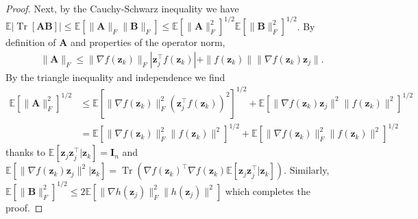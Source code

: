 \documentclass[11pt]{amsart}
\numberwithin{equation}{section}
\numberwithin{equation}{section}
\def\E{{\mathbb{E}}}
\DeclareMathOperator{\trace}{Tr}
\def\mathbold{\boldsymbol} %
\def\bA{\mathbold{A}}\def\calA{{\cal A}}\def\scrA{{\mathscr A}}\def\Ahat{\widehat{A}}\def\Atil{{\widetilde A}}
\def\bB{\mathbold{B}}\def\calB{{\cal B}}\def\scrB{{\mathscr B}}\def\Bhat{\widehat{B}}\def\Btil{{\widetilde B}}
\def\bI{\mathbold{I}}\def\hbI{{\widehat{\bI}}}\def\tbI{{\widetilde{\bI}}}
\def\bz{\mathbold{z}}\def\zhat{\widehat{z}}\def\ztil{\widetilde{z}}\def\zbar{{\overline z}}
\def\calB{{\mathscr B}}
\begin{document}
\begin{proof}
    Next, by the Cauchy-Schwarz inequality we have
    $\E|\trace[\bA\bB]|
    \le \E[\|\bA\|_F\|\bB\|_F]
    \le \E[\|\bA\|_F^2]^{1/2}
        \E[\|\bB\|_F^2]^{1/2}
    $.
    By definition of $\bA$ and properties
    of the operator norm,
    \begin{align*}
    &\|\bA\|_F \le \|\nabla f(\bz_k)\|_F 
    |\bz_j^\top f(\bz_k)| 
    + \| f(\bz_k)\| \|\nabla f(\bz_k) \bz_j\|.
    \end{align*}
    By the triangle inequality and independence we find
    \begin{align*}
    \E[\|\bA\|_F^2]^{1/2}
    &\le
    \E[\|\nabla f(\bz_k)\|_F^2(\bz_j^\top f(\bz_k))^2]^{1/2}
    +
    \E[\|\nabla f(\bz_k)\bz_j\|^2\| f(\bz_k)\|^2]^{1/2}
  \\&=
    \E[\|\nabla f(\bz_k)\|_F^2\|f(\bz_k)\|^2]^{1/2}
    +
    \E[\|\nabla f(\bz_k)\|_F^2\| f(\bz_k)\|^2]^{1/2}
    \end{align*}
    thanks to $\E[\bz_j\bz_j^\top|\bz_k]=\bI_n$
    and $\E[\|\nabla f(\bz_k) \bz_j\|^2|\bz_k] =
    \trace(\nabla f(\bz_k)^\top \nabla f(\bz_k) \E[\bz_j\bz_j^\top|\bz_k])$.
    Similarly,
    $\E[\|\bB\|_F^2]^{1/2}
    \le
    2\E[\|\nabla h(\bz_j)\|_F^2 \|h(\bz_j)\|^2]$
    which completes the proof.
\end{proof}
\end{document}

